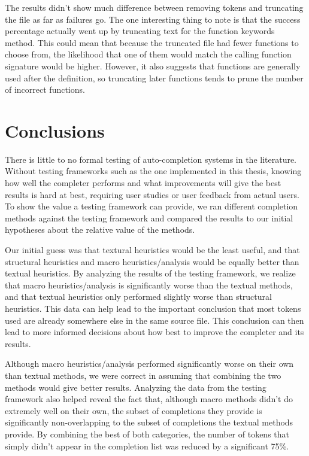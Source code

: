\documentclass[ms,electronic,twosidetoc,letterpaper,chaptercenter,parttop,lol,lof,lot]{byumsphd}
\begin{document}
The results didn't show much difference between removing tokens and truncating the file as far as failures go.
The one interesting thing to note is that the success percentage actually went up by truncating text for the function keywords method.
This could mean that because the truncated file had fewer functions to choose from, the likelihood that one of them would match the calling function signature would be higher.
However, it also suggests that functions are generally used after the definition, so truncating later functions tends to prune the number of incorrect functions.

\chapter{Conclusions}

There is little to no formal testing of auto-completion systems in the literature.
Without testing frameworks such as the one implemented in this thesis, knowing how well the completer performs and what improvements will give the best results is hard at best, requiring user studies or user feedback from actual users.
To show the value a testing framework can provide, we ran different completion methods against the testing framework and compared the results to our initial hypotheses about the relative value of the methods.

Our initial guess was that textural heuristics would be the least useful, and that structural heuristics and macro heuristics/analysis would be equally better than textual heuristics.
By analyzing the results of the testing framework, we realize that macro heuristics/analysis is significantly worse than the textual methods, and that textual heuristics only performed slightly worse than structural heuristics.
This data can help lead to the important conclusion that most tokens used are already somewhere else in the same source file.
This conclusion can then lead to more informed decisions about how best to improve the completer and its results.

Although macro heuristics/analysis performed significantly worse on their own than textual methods, we were correct in assuming that combining the two methods would give better results.
Analyzing the data from the testing framework also helped reveal the fact that, although macro methods didn't do extremely well on their own, the subset of completions they provide is significantly non-overlapping to the subset of completions the textual methods provide.
By combining the best of both categories, the number of tokens that simply didn't appear in the completion list was reduced by a significant 75\%.
\end{document}
